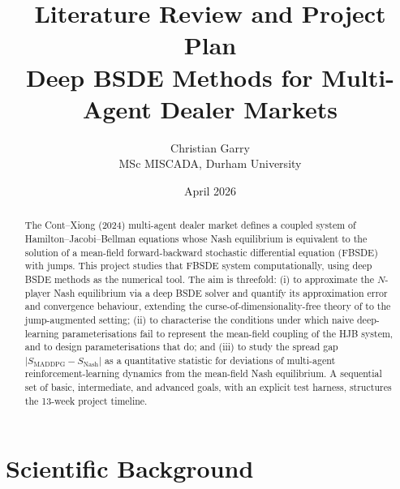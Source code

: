 \documentclass[11pt,a4paper]{article}
\title{\vspace{-2em}Literature Review and Project Plan \\[2pt]
  \large Deep BSDE Methods for Multi-Agent Dealer Markets}
\author{Christian Garry \\ MSc MISCADA, Durham University}
\date{April 2026}
\begin{document}
\maketitle
\vspace{-1em}

\begin{abstract}
\noindent
The Cont--Xiong (2024) multi-agent dealer market defines a coupled
system of Hamilton--Jacobi--Bellman equations whose Nash equilibrium
is equivalent to the solution of a mean-field forward-backward
stochastic differential equation (FBSDE) with jumps.  This project
studies that FBSDE system computationally, using deep BSDE
methods as the numerical tool.  The aim is threefold: (i) to
approximate the $N$-player Nash equilibrium via a deep BSDE solver
and quantify its approximation error and convergence behaviour,
extending the curse-of-dimensionality-free theory of \citet{han2022}
to the jump-augmented setting; (ii) to characterise the conditions
under which naive deep-learning parameterisations fail to
represent the mean-field coupling of the HJB system, and to
design parameterisations that do; and (iii) to study the spread
gap $|S_{\mathrm{MADDPG}} - S_{\mathrm{Nash}}|$ as a quantitative
statistic for deviations of multi-agent reinforcement-learning
dynamics from the mean-field Nash equilibrium.  A sequential set of basic, intermediate, and
advanced goals, with an explicit test harness, structures the
13-week project timeline.
\end{abstract}

\vspace{-0.5em}

\section{Scientific Background}\label{sec:background}
\end{document}

